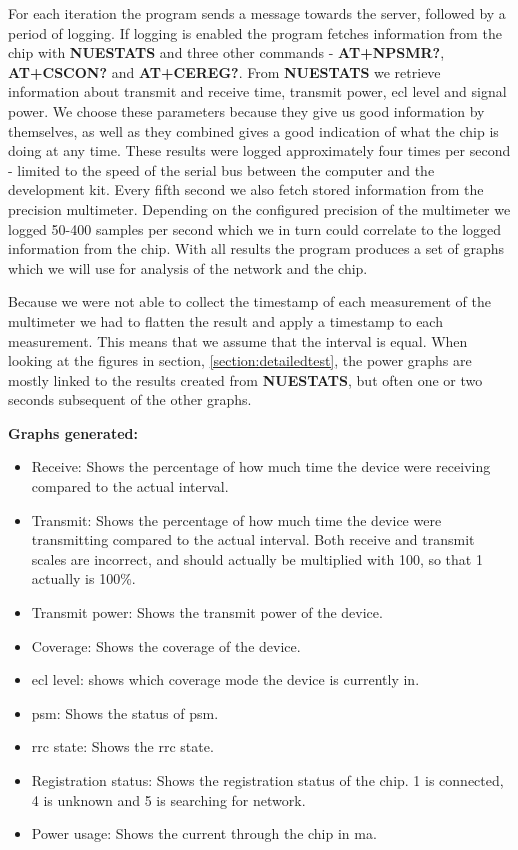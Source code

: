 \documentclass[USenglish]{ifimaster}  %
\begin{document}
For each iteration the program sends a message towards the server, followed by a period of logging. If logging is enabled the program fetches information from the chip with \textbf{NUESTATS} and three other commands - \textbf{AT+NPSMR?}, \textbf{AT+CSCON?} and \textbf{AT+CEREG?}. From \textbf{NUESTATS} we retrieve information about transmit and receive time, transmit power, \acrshort{ecl} level and signal power. We choose these parameters because they give us good information by themselves, as well as they combined gives a good indication of what the chip is doing at any time. These results were logged approximately four times per second - limited to the speed of the serial bus between the computer and the development kit. Every fifth second we also fetch stored information from the precision multimeter. Depending on the configured precision of the multimeter we logged 50-400 samples per second which we in turn could correlate to the logged information from the chip. With all results the program produces a set of graphs which we will use for analysis of the network and the chip.

Because we were not able to collect the timestamp of each measurement of the multimeter we had to flatten the result and apply a timestamp to each measurement. This means that we assume that the interval is equal. When looking at the figures in section, \vref{section:detailedtest}, the power graphs are mostly linked to the results created from \textbf{NUESTATS}, but often one or two seconds subsequent of the other graphs.

\textbf{Graphs generated:}
\begin{itemize}
  \item Receive: Shows the percentage of how much time the device were receiving compared to the actual interval.
  \item Transmit: Shows the percentage of how much time the device were transmitting compared to the actual interval. Both receive and transmit scales are incorrect, and should actually be multiplied with 100, so that 1 actually is 100\%.
  \item Transmit power: Shows the transmit power of the device.
  \item Coverage: Shows the coverage of the device.
  \item \acrshort{ecl} level: shows which coverage mode the device is currently in.
  \item \acrshort{psm}: Shows the status of \acrshort{psm}.
  \item \acrshort{rrc} state: Shows the \acrshort{rrc} state.
  \item Registration status: Shows the registration status of the chip. 1 is connected, 4 is unknown and 5 is searching for network.
  \item Power usage: Shows the current through the chip in \acrshort{ma}.
\end{itemize}
\end{document}
